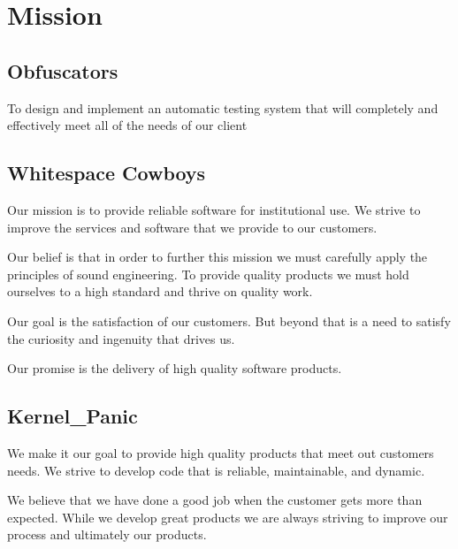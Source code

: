 
\chapter{Mission}

\section{Obfuscators}

To design and implement an automatic testing system that will completely and effectively meet all of the needs of our client

\section{Whitespace Cowboys}
Our mission is to provide reliable software for institutional use. We strive to improve the services and software that we provide to our customers.

Our belief is that in order to further this mission we must carefully apply the principles of sound engineering. To provide quality products we must hold ourselves to a high standard and thrive on quality work.

Our goal is the satisfaction of our customers. But beyond that is a need to satisfy the curiosity and ingenuity that drives us.

Our promise is the delivery of high quality software products.

\section{Kernel\_Panic}
We make it our goal to provide high quality products that meet out customers needs. We strive to develop code that is reliable, maintainable, and dynamic.

We believe that we have done a good job when the customer gets more than expected. While we develop great products we are always striving to improve our process and ultimately our products.
